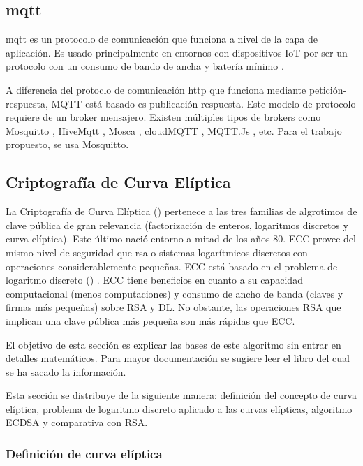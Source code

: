 \subsection{\acrfull{mqtt}}

\acrfull{mqtt} es un protocolo de comunicación que funciona a nivel de la capa de aplicación. Es usado principalmente en entornos
con dispositivos IoT por ser un protocolo con un consumo de bando de ancha y batería mínimo \cite{sugumar2020mqtt}.

A diferencia del protoclo de comunicación \acrfull{http} que funciona mediante petición-respuesta, MQTT está basado es 
publicación-respuesta. Este modelo de protocolo requiere de un broker mensajero. Existen múltiples tipos de brokers como 
Mosquitto \cite{eclipse_2018}, HiveMqtt \cite{hivemq}, Mosca \cite{moscajsmosca_2021}, cloudMQTT \cite{cloudmqtt}, MQTT.Js 
\cite{mqttjs}, etc. Para el trabajo propuesto, se usa Mosquitto.

\subsection{Criptografía de Curva Elíptica}

La Criptografía de Curva Elíptica () pertenece a las tres familias de algrotimos de clave pública de gran relevancia 
(factorización de enteros, logaritmos discretos y curva elíptica). Este último nació entorno a mitad de los años 80.
ECC provee del mismo nivel de seguridad que \acrfull{rsa} o sistemas logarítmicos discretos con operaciones considerablemente 
pequeñas. ECC está basado en el problema de logaritmo discreto () \cite{mccurley1990discrete}. ECC tiene beneficios en cuanto
a su capacidad computacional (menos computaciones) y consumo de ancho de banda (claves y firmas más pequeñas) sobre RSA y DL. No
obstante, las operaciones RSA que implican una clave pública más pequeña son más rápidas que ECC.

El objetivo de esta sección es explicar las bases de este algoritmo sin entrar en detalles matemáticos. Para mayor documentación
se sugiere leer el libro \cite{paar2009understanding} del cual se ha sacado la información.

Esta sección se distribuye de la siguiente manera: definición del concepto de curva elíptica, problema de logaritmo discreto 
aplicado a las curvas elípticas, algoritmo ECDSA y comparativa con RSA.

\subsubsection{Definición de curva elíptica}

